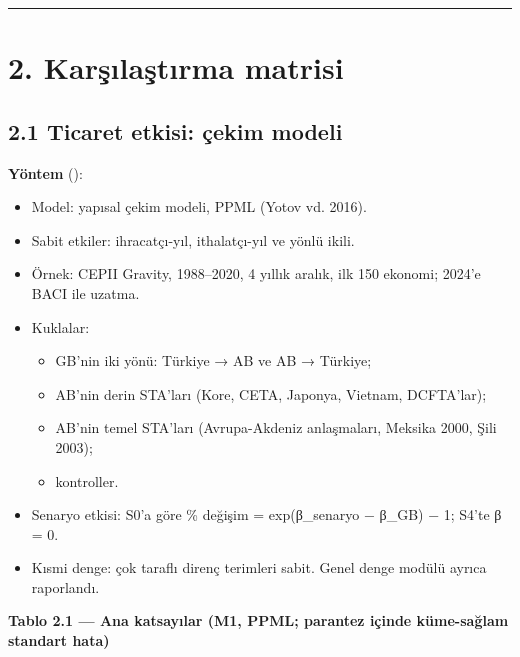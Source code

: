 \begin{center}\rule{0.5\linewidth}{0.5pt}\end{center}

\hypertarget{02b_secenekler_hukuk-2-karux15fux131laux15ftux131rma-matrisi}{%
\section{2. Karşılaştırma matrisi}\label{02b_secenekler_hukuk-2-karux15fux131laux15ftux131rma-matrisi}}

\hypertarget{02b_secenekler_hukuk-21-ticaret-etkisi-uxe7ekim-modeli}{%
\subsection{2.1 Ticaret etkisi: çekim modeli}\label{02b_secenekler_hukuk-21-ticaret-etkisi-uxe7ekim-modeli}}

\textbf{Yöntem} ():

\begin{itemize}
\tightlist
\item
  Model: yapısal çekim modeli, PPML (Yotov vd. 2016).
\item
  Sabit etkiler: ihracatçı-yıl, ithalatçı-yıl ve yönlü ikili.
\item
  Örnek: CEPII Gravity, 1988--2020, 4 yıllık aralık, ilk 150 ekonomi; 2024'e BACI ile uzatma.
\item
  Kuklalar:

  \begin{itemize}
  \tightlist
  \item
    GB'nin iki yönü: Türkiye → AB ve AB → Türkiye;
  \item
    AB'nin derin STA'ları (Kore, CETA, Japonya, Vietnam, DCFTA'lar);
  \item
    AB'nin temel STA'ları (Avrupa-Akdeniz anlaşmaları, Meksika 2000, Şili 2003);
  \item
    kontroller.
  \end{itemize}
\item
  Senaryo etkisi: S0'a göre \% değişim = exp(β\_senaryo − β\_GB) − 1; S4'te β = 0.
\item
  Kısmi denge: çok taraflı direnç terimleri sabit. Genel denge modülü ayrıca raporlandı.
\end{itemize}


\textbf{Tablo 2.1 --- Ana katsayılar (M1, PPML; parantez içinde küme-sağlam standart hata)}

